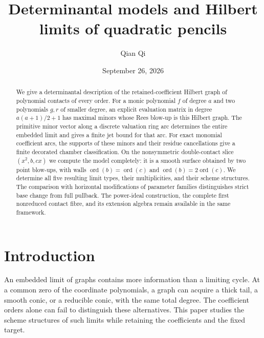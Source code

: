 \documentclass[11pt,reqno]{amsart}
\numberwithin{equation}{section}
\theoremstyle{definition}\newtheorem{definition}[theorem]{Definition}
\theoremstyle{remark}\newtheorem{remark}[theorem]{Remark}
\begin{document}
\title{Determinantal models and Hilbert limits of quadratic pencils}
\author{Qian Qi}
\date{September 26, 2026}
\begin{abstract}
We give a determinantal description of the retained-coefficient Hilbert
graph of polynomial contacts of every order. For a monic polynomial
$f$ of degree $a$ and two polynomials $g,r$ of smaller degree, an
explicit evaluation matrix in degree $a(a+1)/2+1$ has maximal minors
whose Rees blow-up is this Hilbert graph. The primitive minor vector
along a discrete valuation ring arc determines the entire embedded
limit and gives a finite jet bound for that arc. For exact monomial
coefficient arcs, the supports of these minors and their residue
cancellations give a finite decorated chamber classification. On the
nonsymmetric double-contact slice $(x^2,b,cx)$ we compute the model
completely: it is a smooth surface obtained by two point blow-ups,
with walls $\operatorname{ord}(b)=\operatorname{ord}(c)$ and
$\operatorname{ord}(b)=2\operatorname{ord}(c)$. We determine all five
resulting limit types, their multiplicities, and their scheme
structures. The comparison with horizontal modifications of parameter
families distinguishes strict base change from full pullback. The
power-ideal construction, the complete first nonreduced contact fibre,
and its extension algebra remain available in the same framework.
\end{abstract}
\maketitle

\section{Introduction}
\label{sec:paper-ii-v164}\label{sec:paper-ii-v166}\label{sec:paper-ii-v167}
An embedded limit of graphs contains more information than a limiting
cycle. At a common zero of the coordinate polynomials, a graph can
acquire a thick tail, a smooth conic, or a reducible conic, with the
same total degree. The coefficient orders alone can fail to distinguish
these alternatives. This paper studies the scheme structures of such
limits while retaining the coefficients and the fixed target.
\end{document}
